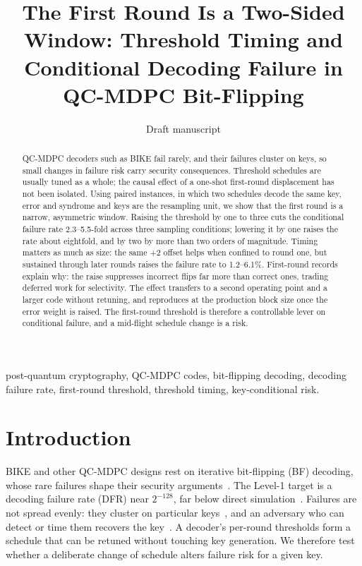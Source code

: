 \documentclass[letterpaper,journal]{IEEEtran}
\begin{document}
\title{The First Round Is a Two-Sided Window: Threshold Timing and
Conditional Decoding Failure in QC-MDPC Bit-Flipping}

\author{Draft manuscript}

\maketitle

\begin{abstract}

QC-MDPC decoders such as BIKE fail rarely, and their failures cluster on keys, so small changes in failure risk carry security consequences. Threshold schedules are usually tuned as a whole; the causal effect of a one-shot first-round displacement has not been isolated. Using paired instances, in which two schedules decode the same key, error and syndrome and keys are the resampling unit, we show that the first round is a narrow, asymmetric window. Raising the threshold by one to three cuts the conditional failure rate 2.3--5.5-fold across three sampling conditions; lowering it by one raises the rate about eightfold, and by two by more than two orders of magnitude. Timing matters as much as size: the same $+2$ offset helps when confined to round one, but sustained through later rounds raises the failure rate to 1.2--6.1\%. First-round records explain why: the raise suppresses incorrect flips far more than correct ones, trading deferred work for selectivity. The effect transfers to a second operating point and a larger code without retuning, and reproduces at the production block size once the error weight is raised. The first-round threshold is therefore a controllable lever on conditional failure, and a mid-flight schedule change is a risk.

\end{abstract}

\begin{IEEEkeywords}
post-quantum cryptography, QC-MDPC codes, bit-flipping decoding, decoding
failure rate, first-round threshold, threshold timing, key-conditional risk.
\end{IEEEkeywords}

\section{Introduction}\label{sec:intro}

BIKE and other QC-MDPC designs rest on iterative bit-flipping (BF) decoding, whose rare failures shape their security arguments~\cite{misoczki2013mdpc,bike2024spec,alagic2025nist}. The Level-1 target is a decoding failure rate (DFR) near $2^{-128}$, far below direct simulation~\cite{sendrier2019dfr,vasseur2021thesis}. Failures are not spread evenly: they cluster on particular keys~\cite{guo2016key,wang2023weak,nosouhi2023weakkey}, and an adversary who can detect or time them recovers the key~\cite{eaton2018timing}. A decoder's per-round thresholds form a schedule that can be retuned without touching key generation. We therefore test whether a deliberate change of schedule alters failure risk for a given key.
\end{document}
